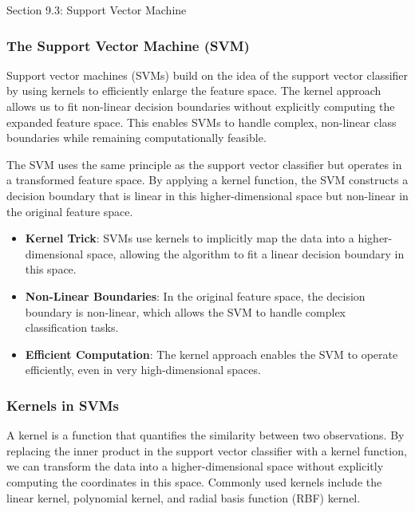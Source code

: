 \begin{notes}{Section 9.3: Support Vector Machine}
    \subsubsection*{The Support Vector Machine (SVM)}
    
    Support vector machines (SVMs) build on the idea of the support vector classifier by using kernels to efficiently enlarge the feature space. The kernel approach allows us to fit non-linear decision boundaries 
    without explicitly computing the expanded feature space. This enables SVMs to handle complex, non-linear class boundaries while remaining computationally feasible.
    
    The SVM uses the same principle as the support vector classifier but operates in a transformed feature space. By applying a kernel function, the SVM constructs a decision boundary that is linear in this 
    higher-dimensional space but non-linear in the original feature space.
    
    \begin{highlight}
        \begin{itemize}
            \item \textbf{Kernel Trick}: SVMs use kernels to implicitly map the data into a higher-dimensional space, allowing the algorithm to fit a linear decision boundary in this space.
            \item \textbf{Non-Linear Boundaries}: In the original feature space, the decision boundary is non-linear, which allows the SVM to handle complex classification tasks.
            \item \textbf{Efficient Computation}: The kernel approach enables the SVM to operate efficiently, even in very high-dimensional spaces.
        \end{itemize}
    \end{highlight}
    
    \subsubsection*{Kernels in SVMs}
    
    A kernel is a function that quantifies the similarity between two observations. By replacing the inner product in the support vector classifier with a kernel function, we can transform the data into a higher-dimensional 
    space without explicitly computing the coordinates in this space. Commonly used kernels include the linear kernel, polynomial kernel, and radial basis function (RBF) kernel.
    

\end{notes}
